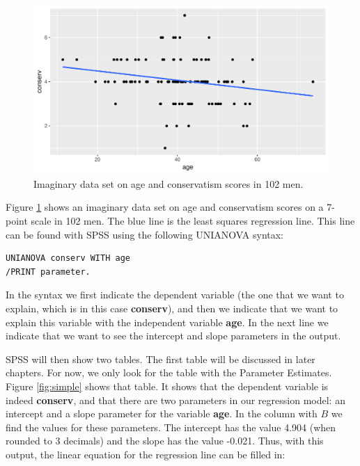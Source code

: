\documentclass[]{book}\usepackage[]{graphicx}\usepackage[]{color}
\makeatletter
\def\maxwidth{ %
  \ifdim\Gin@nat@width>\linewidth
    \linewidth
  \else
    \Gin@nat@width
  \fi
}
\newenvironment{knitrout}{}{} %
\makeatother
\begin{document}
\begin{knitrout}
\color{fgcolor}\begin{figure}

{\centering \includegraphics[width=\maxwidth]{figure/lm_22-1} 

}

\caption[Imaginary data set on age and conservatism scores in 102 men]{Imaginary data set on age and conservatism scores in 102 men.}\label{fig:lm_22}
\end{figure}


\end{knitrout}

Figure \ref{fig:lm_22} shows an imaginary data set on age and conservatism scores on a 7-point scale in 102 men. The blue line is the least squares regression line. This line can be found with SPSS using the following UNIANOVA syntax:

\begin{verbatim}
UNIANOVA conserv WITH age
/PRINT parameter.
\end{verbatim}

In the syntax we first indicate the dependent variable (the one that we want to explain, which is in this case \textbf{conserv}), and then we indicate that we want to explain this variable with the independent variable \textbf{age}. In the next line we indicate that we want to see the intercept and slope parameters in the output.

SPSS will then show two tables. The first table will be discussed in later chapters. For now, we only look for the table with the Parameter Estimates. Figure \ref{fig:simple} shows that table. It shows that the dependent variable is indeed \textbf{conserv}, and that there are two parameters in our regression model: an intercept and a slope parameter for the variable \textbf{age}. In the column with $B$ we find the values for these parameters. The intercept has the value 4.904 (when rounded to 3 decimals) and the slope has the value -0.021. Thus, with this output, the linear equation for the regression line can be filled in:
\end{document}
